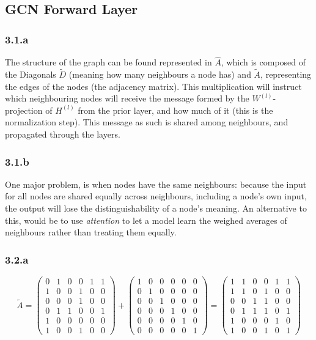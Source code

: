 \subsection{GCN Forward Layer}
\subsubsection*{3.1.a}
The structure of the graph can be found represented in $\hat{A}$, 
which is composed of the Diagonals $\tilde{D}$ (meaning how many neighbours a node has) 
and $\tilde{A}$, representing the edges of the nodes (the adjacency matrix). 
This multiplication will instruct which neighbouring nodes will receive 
the message formed by the $W^{(l)}$-projection of $H^{(l)}$ from the prior layer, 
and how much of it (this is the normalization step). This message as such is shared among neighbours,
and propagated through the layers.

\subsubsection*{3.1.b}
One major problem, is when nodes have the same neighbours: because the input for all nodes
are shared equally across neighbours, including a node's own input, the output will lose
the distinguishability of a node's meaning. An alternative to this, would be to use \emph{attention}
to let a model learn the weighed averages of neighbours rather than treating them equally.

\subsubsection*{3.2.a}
$$ \tilde{A} = 
    \left( \begin{matrix} 0 & 1 & 0 & 0 & 1 & 1 \\ 1 & 0 & 0 & 1 & 0 & 0 \\ 0 & 0 & 0 & 1 & 0 & 0 \\ 0 & 1 & 1 & 0 & 0 & 1 \\ 1 & 0 & 0 & 0 & 0 & 0 \\ 1 & 0 & 0 & 1 & 0 & 0 \end{matrix} \right)
    + \left( \begin{matrix} 1 & 0 & 0 & 0 & 0 & 0 \\ 0 & 1 & 0 & 0 & 0 & 0 \\ 0 & 0 & 1 & 0 & 0 & 0 \\ 0 & 0 & 0 & 1 & 0 & 0 \\ 0 & 0 & 0 & 0 & 1 & 0 \\ 0 & 0 & 0 & 0 & 0 & 1 \end{matrix} \right)
    =
    \left( \begin{matrix} 1 & 1 & 0 & 0 & 1 & 1 \\ 1 & 1 & 0 & 1 & 0 & 0 \\ 0 & 0 & 1 & 1 & 0 & 0 \\ 0 & 1 & 1 & 1 & 0 & 1 \\ 1 & 0 & 0 & 0 & 1 & 0 \\ 1 & 0 & 0 & 1 & 0 & 1 \end{matrix} \right) $$

